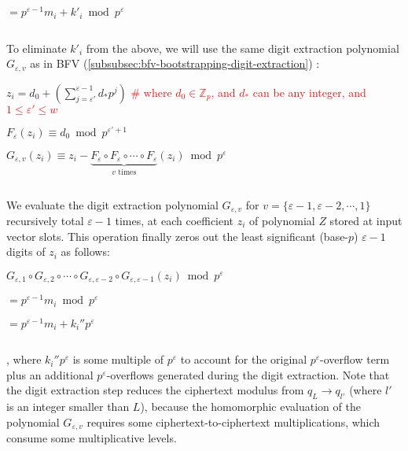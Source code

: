 \begin{enumerate}
$ = p^{\varepsilon-1} m_i + k'_i \bmod p^\varepsilon$

$ $

To eliminate $k'_i$ from the above, we will use the same digit extraction polynomial $G_{\varepsilon, v}$ as in BFV (\autoref{subsubsec:bfv-bootstrapping-digit-extraction}) :

$z_i = d_0 + \left(\sum\limits_{j=\varepsilon'}^{\varepsilon-1} d_* p^j\right)$ \textcolor{red}{ \# where $d_0 \in \mathbb{Z}_p$, \text{ } and $d_*$ can be any integer, \text{ } and $1 \leq \varepsilon' \leq w$}

$F_\varepsilon(z_i) \equiv d_0 \bmod p^{\varepsilon'+1}$

$G_{\varepsilon,v}(z_i) \equiv z_i - \underbrace{F_\varepsilon \circ F_\varepsilon \circ \cdots \circ F_\varepsilon}_{v \text{ times}} (z_i) \bmod p^\varepsilon$

$ $

We evaluate the digit extraction polynomial $G_{\varepsilon,v}$ for $v = \{\varepsilon-1, \varepsilon-2, \cdots, 1\}$ recursively total $\varepsilon-1$ times, at each coefficient $z_i$ of polynomial $Z$ stored at input vector slots. This operation finally zeros out the least significant (base-$p$) $\varepsilon-1$ digits of $z_i$ as follows:

$G_{\varepsilon,1} \circ G_{\varepsilon,2} \circ \cdots \circ G_{\varepsilon,\varepsilon-2} \circ G_{\varepsilon,\varepsilon-1} (z_i) \bmod p^\varepsilon$

$= p^{\varepsilon-1}m_i \bmod p^\varepsilon$

$= p^{\varepsilon-1}m_i + k_i''p^\varepsilon$

$ $

, where $k_i''p^\varepsilon$ is some multiple of $p^\varepsilon$ to account for the original $p^\varepsilon$-overflow term plus an additional $p^\varepsilon$-overflows generated during the digit extraction. Note that the digit extraction step reduces the ciphertext modulus from $q_L \rightarrow q_{l'}$ (where $l'$ is an integer smaller than $L$), because the homomorphic evaluation of the polynomial $G_{\varepsilon, v}$ requires some ciphertext-to-ciphertext multiplications, which consume some multiplicative levels. 

$ $


\end{enumerate}
